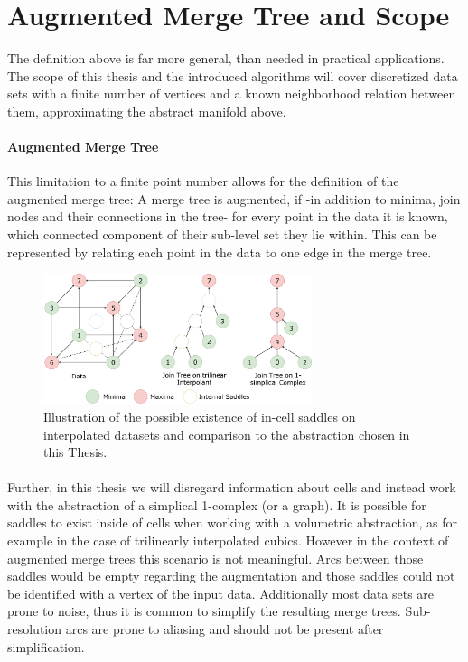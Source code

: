\documentclass[%
	paper=A4,					%
	twoside=true,				%
	openright,					%
	parskip=full,				%
	chapterprefix=true,			%
	11pt,						%
	headings=normal,			%
	bibliography=totoc,			%
	listof=totoc,				%
	titlepage=on,				%
	captions=tableabove,		%
	draft=false,				%
]{scrreprt}%
\begin{document}
\section{Augmented Merge Tree and Scope}
The definition above is far more general, than needed in practical applications. The scope of this thesis and the introduced algorithms will cover discretized data sets with a finite number of vertices and a known neighborhood relation between them, approximating the abstract manifold above. 

\paragraph{Augmented Merge Tree} This limitation to a finite point number allows for the definition of the augmented merge tree: A merge tree is augmented, if -in addition to minima, join nodes and their connections in the tree- for every point in the data it is known, which connected component of their sub-level set they lie within. This can be represented by relating each point in the data to one edge in the merge tree. 

\begin{figure}[h!]
\centering
\includegraphics[width=0.7\textwidth]{figures/Ambiguity.pdf}
\caption{Illustration of the possible existence of in-cell saddles on interpolated datasets and comparison to the abstraction chosen in this Thesis.}
\label{fig:csc}
\end{figure}

\paragraph{} Further, in this thesis we will disregard information about cells and instead work with the abstraction of a simplical 1-complex (or a graph). It is possible for saddles to exist inside of cells when working with a volumetric abstraction, as for example in the case of trilinearly interpolated cubics. However in the context of augmented merge trees this scenario is not meaningful. Arcs between those saddles would be empty regarding the augmentation and those saddles could not be identified with a vertex of the input data. Additionally most data sets are prone to noise, thus it is common to simplify the resulting merge trees. Sub-resolution arcs are prone to aliasing and should not be present after simplification. 
\end{document}
